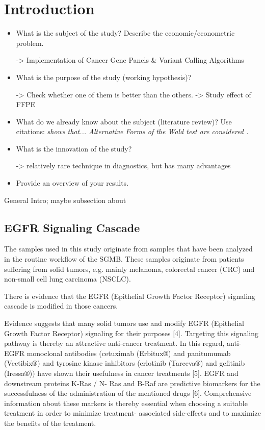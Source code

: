 \section{Introduction}

\begin{itemize}

\item What is the subject of the study? Describe the
economic/econometric problem.

-> Implementation of Cancer Gene Panels & Variant Calling Algorithms

\item What is the purpose of the study (working hypothesis)?

-> Check whether one of them is better than the others.
-> Study effect of FFPE

\item What do we already know about the subject (literature
review)? Use citations: {\it \citet{Gallant:87} shows that...
Alternative Forms of the Wald test are considered
\citep{Breusch&Schmidt:88}.}

\item What is the innovation of the study?

-> relatively rare technique in diagnostics, but has many advantages

\item Provide an overview of your results.


\end{itemize}

General Intro; maybe subsection about

\subsection{EGFR Signaling Cascade}

The samples used in this study originate from samples that have been analyzed in
the routine workflow of the SGMB. These samples originate from patients suffering
from solid tumors, e.g. mainly melanoma, colorectal cancer (CRC) and non-small cell
lung carcinoma (NSCLC).

There is evidence that the EGFR (Epithelial Growth Factor Receptor) signaling
cascade is modified in those cancers.

Evidence suggests that many solid tumors use and modify EGFR (Epithelial
Growth Factor Receptor) signaling for their purposes [4]. Targeting this
signaling pathway is thereby an attractive anti-cancer treatment. In this
regard, anti-EGFR monoclonal antibodies (cetuximab (Erbitux®) and panitumumab
(Vectibix®) and tyrosine kinase inhibitors (erlotinib (Tarceva®) and gefitinib
(Iressa®)) have shown their usefulness in cancer treatments [5]. EGFR and
downstream proteins K-Ras / N- Ras and B-Raf are predictive biomarkers for the
successfulness of the administration of the mentioned drugs [6]. Comprehensive
information about these markers is thereby essential when choosing a suitable
treatment in order to minimize treatment- associated side-effects and to
maximize the benefits of the treatment.

